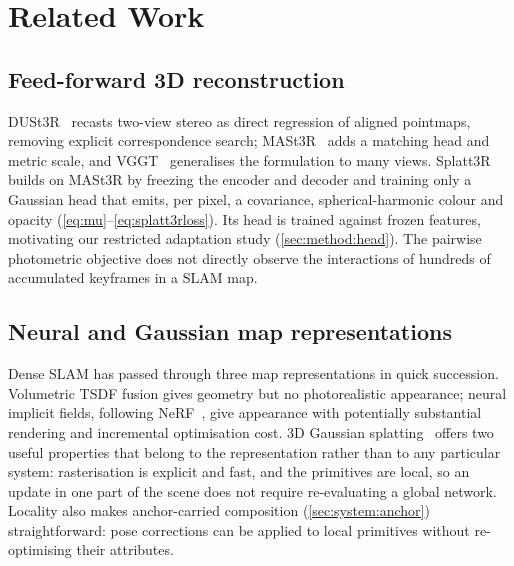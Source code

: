\chapter{Related Work}
\label{ch:related}

\section{Feed-forward 3D reconstruction}
DUSt3R~\cite{wang2024dust3r} recasts two-view stereo as direct regression of
aligned pointmaps, removing explicit correspondence search;
MASt3R~\cite{leroy2024mast3r} adds a matching head and metric scale, and
VGGT~\cite{wang2025vggt} generalises the formulation to many views.
Splatt3R~\cite{smart2024splatt3r} builds on MASt3R by freezing the encoder and
decoder and training only a Gaussian head that emits, per pixel, a covariance,
spherical-harmonic colour and opacity (\cref{eq:mu}--\cref{eq:splatt3rloss}).
Its head is trained against frozen features, motivating our restricted
adaptation study (\cref{sec:method:head}). The pairwise photometric objective
does not directly observe the interactions of hundreds of accumulated
keyframes in a SLAM map.

\section{Neural and Gaussian map representations}
Dense SLAM has passed through three map representations in quick succession.
Volumetric TSDF fusion gives geometry but no photorealistic appearance;
neural implicit fields, following NeRF~\cite{mildenhall2020nerf}, give
appearance with potentially substantial rendering and incremental optimisation
cost. 3D Gaussian splatting~\cite{kerbl20233dgs} offers two useful
properties that belong to the representation rather than to any particular
system: rasterisation is explicit and fast, and the primitives are local, so
an update in one part of the scene does not require re-evaluating a global
network. Locality also makes anchor-carried composition
(\cref{sec:system:anchor}) straightforward: pose corrections can be applied
to local primitives without re-optimising their attributes.

